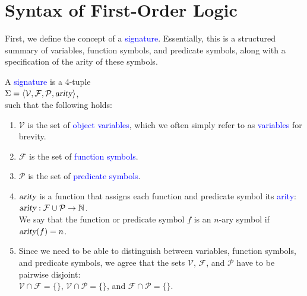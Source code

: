 \section{Syntax of First-Order Logic}
First, we define the concept of a \textcolor{blue}{signature}. Essentially, this is a
structured summary of variables, function symbols, and predicate symbols, along with a specification of the
arity of these symbols. 

\begin{Definition}[Signature]
  A \textcolor{blue}{signature} is a 4-tuple \\[0.2cm]
  \hspace*{1.3cm} $\Sigma = \langle \mathcal{V}, \mathcal{F}, \mathcal{P}, \textsl{arity} \rangle$, \\[0.2cm]
  such that the following holds:
  \begin{enumerate}
  \item $\mathcal{V}$ is the set of \textcolor{blue}{object variables}, which we often simply refer to as
        \textcolor{blue}{variables} for brevity.
  \item $\mathcal{F}$ is the set of \textcolor{blue}{function symbols}.
  \item $\mathcal{P}$ is the set of \textcolor{blue}{predicate symbols}.
  \item $\textsl{arity}$ is a function that assigns each function and predicate symbol its
        \textcolor{blue}{arity}: \\[0.2cm]
        \hspace*{1.3cm} $\textsl{arity}: \mathcal{F} \cup \mathcal{P} \rightarrow \mathbb{N}$. \\[0.2cm]
        We say that the function or predicate symbol $f$ is an
        $n$-ary symbol if $\textsl{arity}(f) = n$.
  \item Since we need to be able to distinguish between variables, function symbols, and predicate symbols,
        we agree that the sets $\mathcal{V}$, $\mathcal{F}$, and $\mathcal{P}$ have to be pairwise disjoint: \\[0.2cm] 
        \hspace*{1.3cm} $\mathcal{V} \cap \mathcal{F} = \{\}$, \quad
                        $\mathcal{V} \cap \mathcal{P} = \{\}$, \quad and \quad
                        $\mathcal{F} \cap \mathcal{P} = \{\}$. \eox
  \end{enumerate}
\end{Definition}


